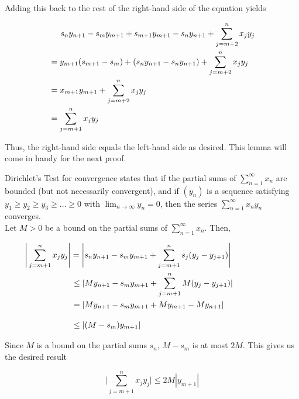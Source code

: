 \documentclass{article}
\begin{document}
Adding this back to the rest of the right-hand side of the equation yields

\begin{equation}
\begin{split}
    & \hspace{5 mm} s_n y_{n+1} - s_m y_{m+1} + s_{m+1}y_{m+1} - s_n y_{n+1} + \sum_{j=m+2}^{n} x_j y_j \\
    &= y_{m+1}(s_{m+1} - s_m) + ( s_n y_{n+1} - s_n y_{n+1}) + \sum_{j=m+2}^{n} x_j y_j \\
    &= x_{m+1} y_{m+1} + \sum_{j=m+2}^{n} x_j y_j \\
    &= \sum_{j=m+1}^{n} x_j y_j
\end{split}
\end{equation}

Thus, the right-hand side equals the left-hand side as desired. This lemma will come in handy for the next proof. 
\newpage

Dirichlet's Test for convergence states that if the partial sums of $\sum_{n=1}^{\infty} x_n$ are bounded (but not necessarily convergent),
and if $(y_n)$ is a sequence satisfying $y_1 \geq y_2 \geq y_3 \geq \dots \geq 0$ with $\lim_{n\to \infty} y_n = 0$,
then the series $\sum_{n=1}^{\infty} x_n y_n$ converges. \\

Let $M > 0$ be a bound on the partial sums of $\sum_{n=1}^{\infty} x_n$. Then, 

\begin{equation}
\begin{split}
    &\hspace{-20 mm}\Bigg|\sum_{j=m+1}^{n} x_j y_j \Bigg| = \Bigg| s_n y_{n+1} - s_m y_{m+1} + \sum_{j=m+1}^{n} s_j(y_{j} - y_{j+1})\Bigg| \\
    &\leq | M y_{n+1} - s_m y_{m+1} + \sum_{j=m+1}^{n} M(y_{j} - y_{j+1}) | \\
    &= | M y_{n+1} - s_m y_{m+1} + M y_{m+1} - M y_{n+1} | \\[10 pt]
    &\leq | (M - s_m) y_{m+1} |
\end{split}
\end{equation}

Since $M$ is a bound on the partial sums $s_n$, $M - s_m$ is at most $2M$. This gives us the desired result

\begin{equation}
    \Bigg|\sum_{j=m+1}^{n} x_j y_j \Bigg| \leq 2M|y_{m+1}|
\end{equation}
\end{document}
